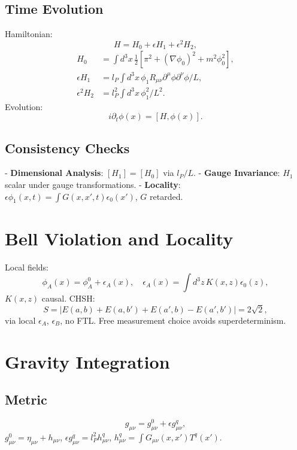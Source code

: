 \documentclass{article}
\begin{document}
\subsection{Time Evolution}
Hamiltonian:
\begin{equation}
H = H_0 + \epsilon H_1 + \epsilon^2 H_2,
\end{equation}
\begin{align}
H_0 &= \int d^3x \, \frac{1}{2} [\pi^2 + (\nabla \phi_0)^2 + m^2 \phi_0^2], \\
\epsilon H_1 &= l_P \int d^3x \, \phi_1 R_{\mu\nu} \partial^\mu \phi \partial^\nu \phi / L, \\
\epsilon^2 H_2 &= l_P^2 \int d^3x \, \phi_1^2 / L^2.
\end{align}
Evolution:
\begin{equation}
i \partial_t \phi(x) = [H, \phi(x)].
\end{equation}

\subsection{Consistency Checks}
- \textbf{Dimensional Analysis}: \([H_1] = [H_0]\) via \(l_P / L\).
- \textbf{Gauge Invariance}: \(H_1\) scalar under gauge transformations.
- \textbf{Locality}: \(\epsilon \phi_1(x,t) = \int G(x,x',t) \epsilon_0(x')\), \(G\) retarded.

\section{Bell Violation and Locality}
Local fields:
\begin{equation}
\phi_A(x) = \phi_A^0 + \epsilon_A(x), \quad \epsilon_A(x) = \int d^3z \, K(x,z) \epsilon_0(z),
\end{equation}
\(K(x,z)\) causal. CHSH:
\begin{equation}
S = |E(a,b) + E(a,b') + E(a',b) - E(a',b')| = 2\sqrt{2},
\end{equation}
via local \(\epsilon_A\), \(\epsilon_B\), no FTL. Free measurement choice avoids superdeterminism.

\section{Gravity Integration}
\subsection{Metric}
\begin{equation}
g_{\mu\nu} = g_{\mu\nu}^0 + \epsilon g_{\mu\nu}^q,
\end{equation}
\(g_{\mu\nu}^0 = \eta_{\mu\nu} + h_{\mu\nu}\), \(\epsilon g_{\mu\nu}^q = l_P^2 h_{\mu\nu}^q\), \(h_{\mu\nu}^q = \int G_{\mu\nu}(x,x') T^q(x')\).
\end{document}

